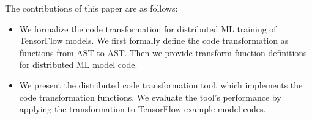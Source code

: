 The contributions of this paper are as follows:

\begin{itemize}
  \item We formalize the code transformation for distributed ML training
        of TensorFlow models. We first formally define the code transformation
        as functions from AST to AST. Then we provide transform function
        definitions for distributed ML model code.
  \item We present the distributed code transformation tool, which implements
        the code transformation functions. We evaluate the tool's performance
        by applying the transformation to TensorFlow example model codes.
\end{itemize}
